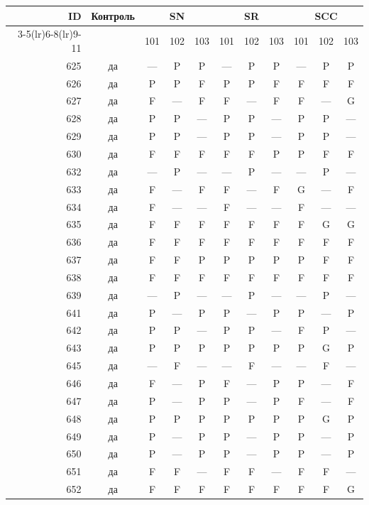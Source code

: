 \begin{table}[p]\centering\small
\begin{tabular*}{\textwidth}{@{\extracolsep{\fill}}rc*{9}{c}@{}}\toprule
ID & Контроль & \multicolumn{3}{c}{SN} & \multicolumn{3}{c}{SR} & \multicolumn{3}{c}{SCC}\\
\cmidrule(lr){3-5}\cmidrule(lr){6-8}\cmidrule(lr){9-11}
 & & 101 & 102 & 103 & 101 & 102 & 103 & 101 & 102 & 103\\\midrule
625 & да & — & P & P & — & P & P & — & P & P\\
626 & да & P & P & F & P & P & F & F & F & F\\
627 & да & F & — & F & F & — & F & F & — & G\\
628 & да & P & P & — & P & P & — & P & P & —\\
629 & да & P & P & — & P & P & — & P & P & —\\
630 & да & F & F & F & F & F & P & P & F & F\\
632 & да & — & P & — & — & P & — & — & P & —\\
633 & да & F & — & F & F & — & F & G & — & F\\
634 & да & F & — & — & F & — & — & F & — & —\\
635 & да & F & F & F & F & F & F & F & G & G\\
636 & да & F & F & F & F & F & F & F & F & F\\
637 & да & F & F & P & P & P & P & P & F & F\\
638 & да & F & F & F & F & F & F & F & F & F\\
639 & да & — & P & — & — & P & — & — & P & —\\
641 & да & P & — & P & P & — & P & P & — & P\\
642 & да & P & P & — & P & P & — & F & P & —\\
643 & да & P & P & P & P & P & P & P & G & P\\
645 & да & — & F & — & — & F & — & — & F & —\\
646 & да & F & — & P & F & — & P & P & — & F\\
647 & да & P & — & P & P & — & P & F & — & F\\
648 & да & P & P & P & P & P & P & P & G & P\\
649 & да & P & — & P & P & — & P & P & — & P\\
650 & да & P & — & P & P & — & P & P & — & P\\
651 & да & F & F & — & F & F & — & F & F & —\\
652 & да & F & F & F & F & F & F & F & F & G\\

\end{tabular*}
\end{table}
